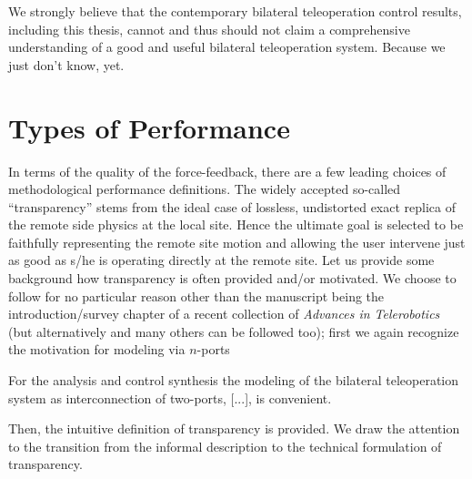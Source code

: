 We strongly believe that the contemporary bilateral teleoperation control results, including this thesis, 
cannot and thus should not claim a comprehensive understanding of a good and useful bilateral teleoperation 
system. Because we just don't know, yet.

\section{Types of Performance}

In terms of the quality of the force-feedback, there are a few leading choices of methodological performance 
definitions. The widely accepted so-called \enquote{transparency} stems from the ideal case of lossless, undistorted
exact replica of the remote side physics at the local site. Hence the ultimate goal is selected to be 
faithfully representing the remote site motion and allowing the user intervene just as good as s/he is operating 
directly at the remote site. Let us provide some background how transparency is often provided and/or motivated. We
choose to follow \cite{hirchebookchap} for no particular reason other than the manuscript being the introduction/survey 
chapter of a recent collection of \emph{Advances in Telerobotics} (but alternatively \cite{dudragne,yokokohjiyoshikawa,hannaford89} and many 
others can be followed too); first we again recognize the motivation for modeling via $n$-ports

\begin{displayquote}
For the analysis and control synthesis the modeling of the bilateral teleoperation system as interconnection of two-ports, [...], is 
convenient. 
\end{displayquote}
Then, the intuitive definition of transparency is provided. We draw the attention to the 
transition from the informal description to the technical formulation of transparency. 

